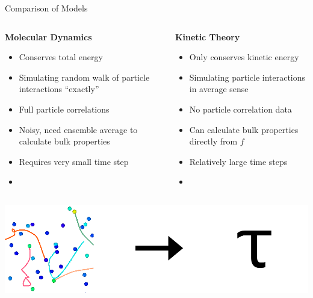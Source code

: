 \documentclass{beamer}
\begin{document}
	\begin{frame}[t]{Comparison of Models}
		\vspace{-0.8em}
		\begin{columns}
			\begin{column}{0.55\textwidth}
				\begin{center}\textbf{Molecular Dynamics}\end{center}\vspace{-0.8em}
				\begin{itemize}
					\item  \color{blue}Conserves total energy
					\item  Simulating random walk of particle interactions ``exactly''
					\item  Full particle correlations
					\item  \color{red}Noisy, need ensemble average to calculate bulk properties
					\item  Requires very small time step
					\item  {}
				\end{itemize}
			\end{column}
			\begin{column}{0.55\textwidth}
				\begin{center}\textbf{Kinetic Theory}\end{center}\vspace{-0.8em}
				\begin{itemize}
					\item  \color{red}Only conserves kinetic energy
					\item  Simulating particle interactions in average sense
					\item  No particle correlation data
					\item  \color{blue}Can calculate bulk properties directly from $f$
					\item  Relatively large time steps
					\item  {}
				\end{itemize}
			\end{column}
		\end{columns}
		\begin{center}
			\includegraphics[height=0.3\textheight]{random_walk.png}
		\end{center}
	\end{frame}
	
\end{document}
